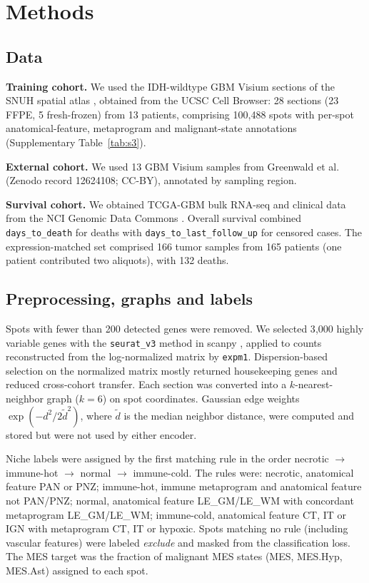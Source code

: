 \documentclass[11pt,letterpaper]{article}
\begin{document}
\section{Methods}

\subsection{Data}

\textbf{Training cohort.} We used the IDH-wildtype GBM Visium sections of the SNUH spatial atlas \cite{park2026}, obtained from the UCSC Cell Browser: 28 sections (23 FFPE, 5 fresh-frozen) from 13 patients, comprising 100{,}488 spots with per-spot anatomical-feature, metaprogram and malignant-state annotations (Supplementary Table~\ref{tab:s3}).

\textbf{External cohort.} We used 13 GBM Visium samples from Greenwald et al.\ \cite{greenwald2024} (Zenodo record 12624108; CC-BY), annotated by sampling region.

\textbf{Survival cohort.} We obtained TCGA-GBM bulk RNA-seq and clinical data from the NCI Genomic Data Commons \cite{tcga2008}. Overall survival combined \texttt{days\_to\_death} for deaths with \texttt{days\_to\_last\_follow\_up} for censored cases. The expression-matched set comprised 166 tumor samples from 165 patients (one patient contributed two aliquots), with 132 deaths.

\subsection{Preprocessing, graphs and labels}

Spots with fewer than 200 detected genes were removed. We selected 3{,}000 highly variable genes with the \texttt{seurat\_v3} method \cite{stuart2019} in scanpy \cite{wolf2018}, applied to counts reconstructed from the log-normalized matrix by \texttt{expm1}. Dispersion-based selection on the normalized matrix mostly returned housekeeping genes and reduced cross-cohort transfer. Each section was converted into a $k$-nearest-neighbor graph ($k = 6$) on spot coordinates. Gaussian edge weights $\exp(-d^2 / 2\tilde{d}^2)$, where $\tilde{d}$ is the median neighbor distance, were computed and stored but were not used by either encoder.

Niche labels were assigned by the first matching rule in the order necrotic $\rightarrow$ immune-hot $\rightarrow$ normal $\rightarrow$ immune-cold. The rules were: necrotic, anatomical feature PAN or PNZ; immune-hot, immune metaprogram and anatomical feature not PAN/PNZ; normal, anatomical feature LE\_GM/LE\_WM with concordant metaprogram LE\_GM/LE\_WM; immune-cold, anatomical feature CT, IT or IGN with metaprogram CT, IT or hypoxic. Spots matching no rule (including vascular features) were labeled \emph{exclude} and masked from the classification loss. The MES target was the fraction of malignant MES states (MES, MES.Hyp, MES.Ast) assigned to each spot.
\end{document}
